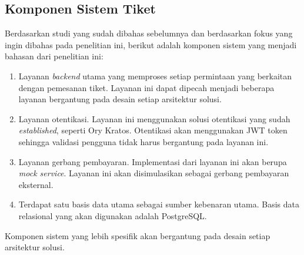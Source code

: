 \subsection{Komponen Sistem Tiket}

Berdasarkan studi yang sudah dibahas sebelumnya dan berdasarkan fokus yang ingin dibahas pada penelitian ini, berikut adalah komponen sistem yang menjadi bahasan dari penelitian ini:

\begin{enumerate}
    \item Layanan \textit{backend} utama yang memproses setiap permintaan yang berkaitan dengan pemesanan tiket. Layanan ini dapat dipecah menjadi beberapa layanan bergantung pada desain setiap arsitektur solusi.
    \item Layanan otentikasi. Layanan ini menggunakan solusi otentikasi yang sudah \textit{established}, seperti Ory Kratos. Otentikasi akan menggunakan JWT token sehingga validasi pengguna tidak harus bergantung pada layanan ini.
    \item Layanan gerbang pembayaran. Implementasi dari layanan ini akan berupa \textit{mock service}. Layanan ini akan disimulasikan sebagai gerbang pembayaran eksternal.
    \item Terdapat satu basis data utama sebagai sumber kebenaran utama. Basis data relasional yang akan digunakan adalah PostgreSQL.
\end{enumerate}

Komponen sistem yang lebih spesifik akan bergantung pada desain setiap arsitektur solusi.